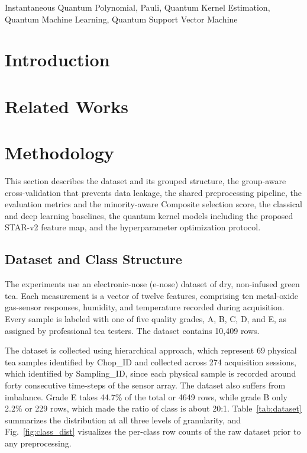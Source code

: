 \documentclass{ieeeaccess}
\begin{document}
\begin{keywords}
Instantaneous Quantum Polynomial, Pauli, Quantum Kernel Estimation, Quantum Machine Learning, Quantum Support Vector Machine
\end{keywords}

\titlepgskip=-21pt

\maketitle

\section{Introduction}

\section{Related Works}

\section{Methodology}
\label{sec:methodology}

This section describes the dataset and its grouped structure, the group-aware cross-validation that prevents data leakage, the shared preprocessing pipeline, the evaluation metrics and the minority-aware Composite selection score, the classical and deep learning baselines, the quantum kernel models including the proposed STAR-v2 feature map, and the hyperparameter optimization protocol.

\subsection{Dataset and Class Structure}
\label{subsec:dataset}

The experiments use an electronic-nose (e-nose) dataset of dry, non-infused green tea. Each measurement is a vector of twelve features, comprising ten metal-oxide gas-sensor responses, humidity, and temperature recorded during acquisition. Every sample is labeled with one of five quality grades, A, B, C, D, and E, as assigned by professional tea testers. The dataset contains 10{,}409 rows.

The dataset is collected using hierarchical approach, which represent 69 physical tea samples identified by Chop\_ID and collected across 274 acquisition sessions, which identified by Sampling\_ID, since each physical sample is recorded around forty consecutive time-steps of the sensor array. The dataset also suffers from imbalance. Grade E takes 44.7\% of the total or 4649 rows, while grade B only 2.2\% or 229 rows, which made the ratio of class is about 20:1. Table~\ref{tab:dataset} summarizes the distribution at all three levels of granularity, and Fig.~\ref{fig:class_dist} visualizes the per-class row counts of the raw dataset prior to any preprocessing.
\end{document}
